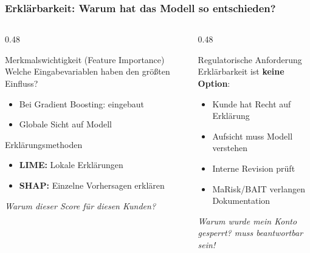 \documentclass[11pt, aspectratio=169]{beamer}
\begin{document}
\begin{frame}
    \frametitle{Erklärbarkeit: Warum hat das Modell so entschieden?}
    \begin{columns}[t]
        \begin{column}{0.48\textwidth}
            \begin{block}{Merkmalswichtigkeit (Feature Importance)}
                Welche Eingabevariablen haben den größten Einfluss?
                \begin{itemize}
                    \item Bei Gradient Boosting: eingebaut
                    \item Globale Sicht auf Modell
                \end{itemize}
            \end{block}
            \vspace{0.2cm}
            \begin{block}{Erklärungsmethoden}
                \begin{itemize}
                    \item \textbf{LIME:} Lokale Erklärungen
                    \item \textbf{SHAP:} Einzelne Vorhersagen erklären
                \end{itemize}
                \vspace{0.1cm}
                \textit{Warum dieser Score für diesen Kunden?}
            \end{block}
        \end{column}
        \begin{column}{0.48\textwidth}
            \begin{alertblock}{Regulatorische Anforderung}
                Erklärbarkeit ist \textbf{keine Option}:
                \begin{itemize}
                    \item Kunde hat Recht auf Erklärung
                    \item Aufsicht muss Modell verstehen
                    \item Interne Revision prüft
                    \item MaRisk/BAIT verlangen Dokumentation
                \end{itemize}
            \end{alertblock}
            \vspace{0.2cm}
            \textit{\glqq Warum wurde mein Konto gesperrt?\grqq{} muss beantwortbar sein!}
        \end{column}
    \end{columns}
\end{frame}
\end{document}
